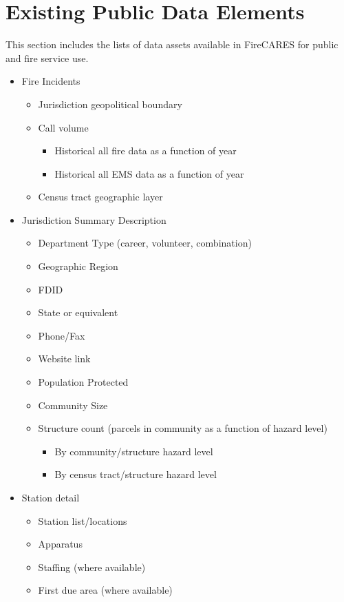 \documentclass[12pt,oneside]{book}
\begin{document}
\chapter{Existing Public Data Elements }
This section includes the lists of data assets available in FireCARES for public and fire service use.
\begin{itemize}[noitemsep]
\item Fire Incidents
  \begin{itemize}[noitemsep]
  \item Jurisdiction geopolitical boundary
  \item Call volume
    \begin{itemize}[noitemsep]
    \item Historical all fire data as a function of year
    \item Historical all EMS data as a function of year
    \end{itemize}
  \item Census tract geographic layer
  \end{itemize}
\item Jurisdiction Summary Description
  \begin{itemize}[noitemsep]
  \item Department Type (career, volunteer, combination)
  \item Geographic Region
  \item FDID
  \item State or equivalent
  \item Phone/Fax
  \item Website link
  \item Population Protected
  \item Community Size
  \item Structure count (parcels in community as a function of hazard level)
    \begin{itemize}[noitemsep]
    \item By community/structure hazard level
    \item By census tract/structure hazard level
    \end{itemize}
  \end{itemize}
\item Station detail
  \begin{itemize}[noitemsep]
  \item Station list/locations
  \item Apparatus
  \item Staffing (where available)
  \item First due area (where available)

\end{itemize}
\end{itemize}
\end{document}
